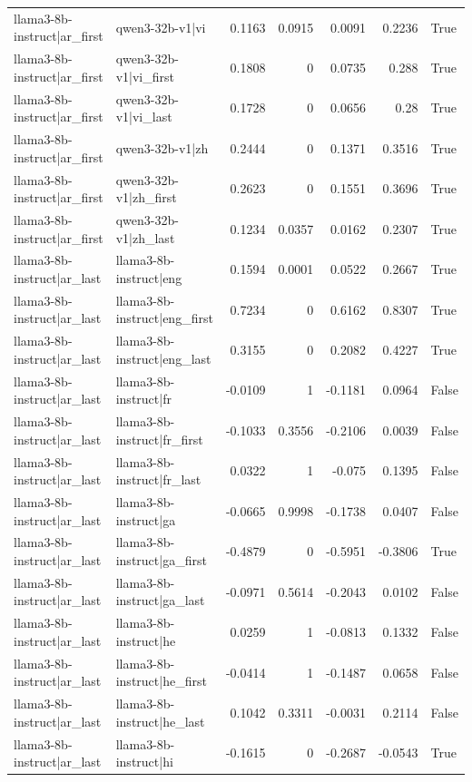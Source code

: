 \begin{table}
\begin{tabular}{l l r r r r l}
llama3-8b-instruct|ar_first & qwen3-32b-v1|vi & 0.1163 & 0.0915 & 0.0091 & 0.2236 & True \\
llama3-8b-instruct|ar_first & qwen3-32b-v1|vi_first & 0.1808 & 0 & 0.0735 & 0.288 & True \\
llama3-8b-instruct|ar_first & qwen3-32b-v1|vi_last & 0.1728 & 0 & 0.0656 & 0.28 & True \\
llama3-8b-instruct|ar_first & qwen3-32b-v1|zh & 0.2444 & 0 & 0.1371 & 0.3516 & True \\
llama3-8b-instruct|ar_first & qwen3-32b-v1|zh_first & 0.2623 & 0 & 0.1551 & 0.3696 & True \\
llama3-8b-instruct|ar_first & qwen3-32b-v1|zh_last & 0.1234 & 0.0357 & 0.0162 & 0.2307 & True \\
llama3-8b-instruct|ar_last & llama3-8b-instruct|eng & 0.1594 & 0.0001 & 0.0522 & 0.2667 & True \\
llama3-8b-instruct|ar_last & llama3-8b-instruct|eng_first & 0.7234 & 0 & 0.6162 & 0.8307 & True \\
llama3-8b-instruct|ar_last & llama3-8b-instruct|eng_last & 0.3155 & 0 & 0.2082 & 0.4227 & True \\
llama3-8b-instruct|ar_last & llama3-8b-instruct|fr & -0.0109 & 1 & -0.1181 & 0.0964 & False \\
llama3-8b-instruct|ar_last & llama3-8b-instruct|fr_first & -0.1033 & 0.3556 & -0.2106 & 0.0039 & False \\
llama3-8b-instruct|ar_last & llama3-8b-instruct|fr_last & 0.0322 & 1 & -0.075 & 0.1395 & False \\
llama3-8b-instruct|ar_last & llama3-8b-instruct|ga & -0.0665 & 0.9998 & -0.1738 & 0.0407 & False \\
llama3-8b-instruct|ar_last & llama3-8b-instruct|ga_first & -0.4879 & 0 & -0.5951 & -0.3806 & True \\
llama3-8b-instruct|ar_last & llama3-8b-instruct|ga_last & -0.0971 & 0.5614 & -0.2043 & 0.0102 & False \\
llama3-8b-instruct|ar_last & llama3-8b-instruct|he & 0.0259 & 1 & -0.0813 & 0.1332 & False \\
llama3-8b-instruct|ar_last & llama3-8b-instruct|he_first & -0.0414 & 1 & -0.1487 & 0.0658 & False \\
llama3-8b-instruct|ar_last & llama3-8b-instruct|he_last & 0.1042 & 0.3311 & -0.0031 & 0.2114 & False \\
llama3-8b-instruct|ar_last & llama3-8b-instruct|hi & -0.1615 & 0 & -0.2687 & -0.0543 & True \\

\end{tabular}
\end{table}
